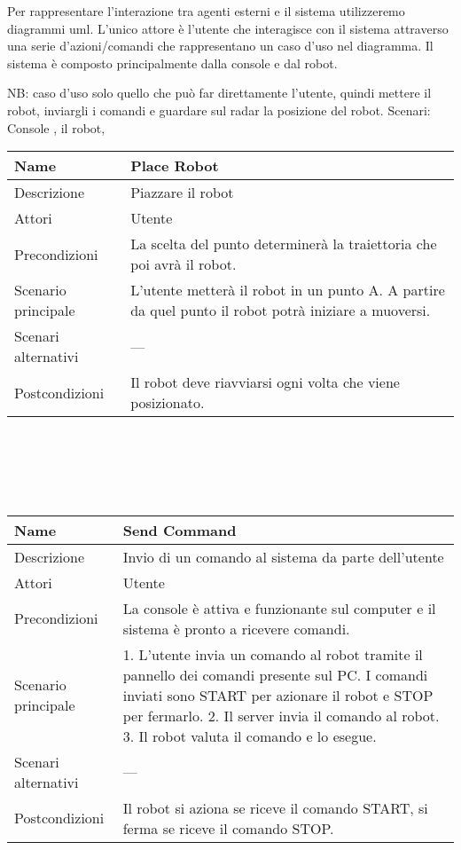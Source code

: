 \documentclass[a4paper]{article}
\begin{document}
Per rappresentare l’interazione tra agenti esterni e il sistema utilizzeremo diagrammi uml.
L’unico attore è l’utente che interagisce con il sistema attraverso una serie d’azioni/comandi che rappresentano un caso d’uso nel diagramma. Il sistema è composto principalmente dalla console e dal robot. 

NB: caso d’uso solo quello che può far direttamente l’utente, quindi mettere il robot, inviargli i comandi e guardare sul radar la posizione del robot. 
Scenari: Console , il robot,
\\
\begin{tabular}{ | m{5cm} | m{5cm}| }
\hline
	Name&Place Robot\\ 
\hline	
	Descrizione&Piazzare il robot\\
\hline	
	Attori&Utente\\
\hline	
	Precondizioni&La scelta del punto determinerà la traiettoria che poi avrà il robot.\\
\hline	
Scenario principale&L’utente metterà il robot in un punto A. A partire da quel punto il robot potrà iniziare a muoversi.\\
\hline	
Scenari alternativi&---\\
\hline	
Postcondizioni&Il robot deve riavviarsi ogni volta che viene posizionato.\\
\hline
\end{tabular}
\\
\\
\\
\\

\begin{tabular}{ | m{5cm} | m{5cm}| }
	\hline
	Name&Send Command\\ 
	\hline	
	Descrizione&Invio di un comando al sistema da parte dell’utente\\
	\hline	
	Attori&Utente\\
	\hline	
	Precondizioni&La console è attiva e funzionante sul computer e il sistema è pronto a ricevere comandi.\\
	\hline	
	Scenario principale&1. L’utente invia un comando al robot tramite il pannello dei comandi presente sul PC. I comandi inviati sono START per azionare il robot e STOP per fermarlo.
	2. Il server invia il comando al robot.
	3. Il robot valuta il comando e lo esegue.\\
	\hline	
	Scenari alternativi&---\\
	\hline	
	Postcondizioni&Il robot si aziona se riceve il comando START, si ferma se riceve il comando STOP.\\
	\hline
\end{tabular}
\end{document}
